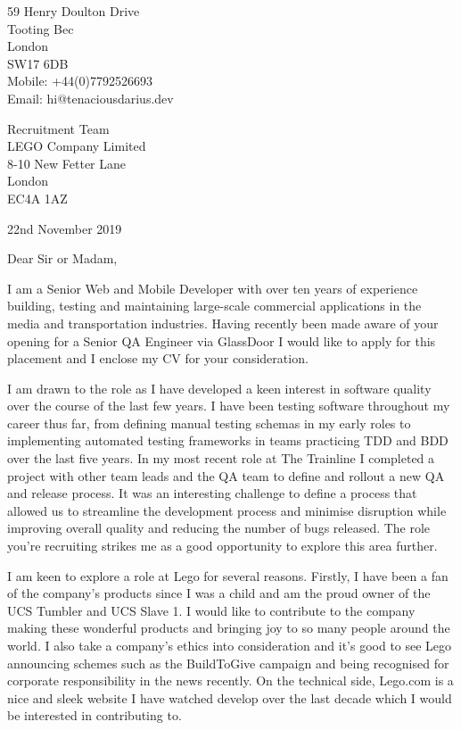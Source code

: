 \documentclass[11pt,letterpaper]{article}
\begin{document}
 
\begin{flushright} 
59 Henry Doulton Drive \\ 
Tooting Bec \\ 
London \\
SW17 6DB \\
Mobile: +44(0)7792526693 \\
Email: hi@tenaciousdarius.dev
\end{flushright}  
\begin{flushleft} 
Recruitment Team \\
LEGO Company Limited \\ 
8-10 New Fetter Lane \\ 
London \\
EC4A 1AZ
\end{flushleft} 
\begin{flushleft}
22nd November 2019
\end{flushleft} 
\bigskip 
Dear Sir or Madam, 

I am a Senior Web and Mobile Developer with over ten years of experience building, testing and maintaining large-scale commercial applications in the media and transportation industries. Having recently been made aware of your opening for a Senior QA Engineer via GlassDoor I would like to apply for this placement and I enclose my CV for your consideration.

I am drawn to the role as I have developed a keen interest in software quality over the course of the last few years. I have been testing software throughout my career thus far, from defining manual testing schemas in my early roles to implementing automated testing frameworks in teams practicing TDD and BDD over the last five years. In my most recent role at The Trainline I completed a project with other team leads and the QA team to define and rollout a new QA and release process. It was an interesting challenge to define a process that allowed us to streamline the development process and minimise disruption while improving overall quality and reducing the number of bugs released. The role you're recruiting strikes me as a good opportunity to explore this area further.

I am keen to explore a role at Lego for several reasons. Firstly, I have been a fan of the company's products since I was a child and am the proud owner of the UCS Tumbler and UCS Slave 1. I would like to contribute to the company making these wonderful products and bringing joy to so many people around the world. I also take a company's ethics into consideration and it's good to see Lego announcing schemes such as the BuildToGive campaign and being recognised for corporate responsibility in the news recently. On the technical side, Lego.com is a nice and sleek website I have watched develop over the last decade which I would be interested in contributing to.
\end{document}
